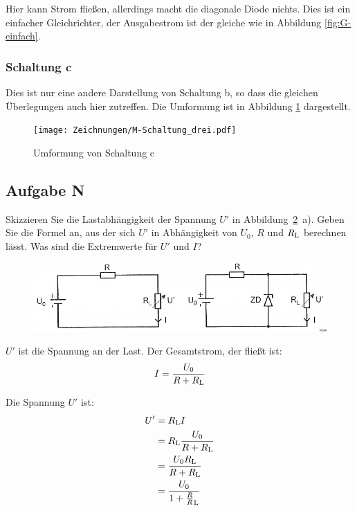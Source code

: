 Hier kann Strom fließen, allerdings macht die diagonale Diode nichts. Dies ist
ein einfacher Gleichrichter, der Ausgabestrom ist der gleiche wie in Abbildung
\ref{fig:G-einfach}.

\subsubsection{Schaltung c}

Dies ist nur eine andere Darstellung von Schaltung b, so dass die gleichen
Überlegungen auch hier zutreffen. Die Umformung ist in Abbildung
\ref{fig:M-Schaltung_drei} dargestellt.

\begin{figure}[htbp]
	\centering
	\caption{%
		Umformung von Schaltung c
	}
	\label{fig:M-Schaltung_drei}
	\texttt{[image: Zeichnungen/M-Schaltung\_drei.pdf]}
\end{figure}

\FloatBarrier
\subsection{Aufgabe N}

\begin{problem}
	Skizzieren Sie die Lastabhängigkeit der Spannung $U'$ in
	Abbildung~\ref{fig:2-11}~a). Geben Sie die Formel an, aus der sich $U'$ in
	Abhängigkeit von $U_0$, $R$ und $R_\text L$ berechnen lässt. Was sind die
	Extremwerte für $U'$ und $I$?
\end{problem}

\begin{figure}[htbp]
	\centering
	\caption{%
		\cite[Abbildung~2.11]{physik313-Anleitung}
	}
	\label{fig:2-11}
	\includegraphics[width=\linewidth]{Bilder_aus_Anleitung/2-11.png}
\end{figure}

$U'$ ist die Spannung an der Last. Der Gesamtstrom, der fließt ist:
\[
	I = \frac{U_0}{R + R_\text L}
\]

\newcommand\RL{R_\text L}

Die Spannung $U'$ ist:
\begin{align*}
	U'
	&= \RL I \\
	&= \RL \frac{U_0}{R + R_\text L} \\
	&= \frac{U_0 \RL}{R + \RL} \\
	&= \frac{U_0}{1 + \frac R\RL}
\end{align*}


